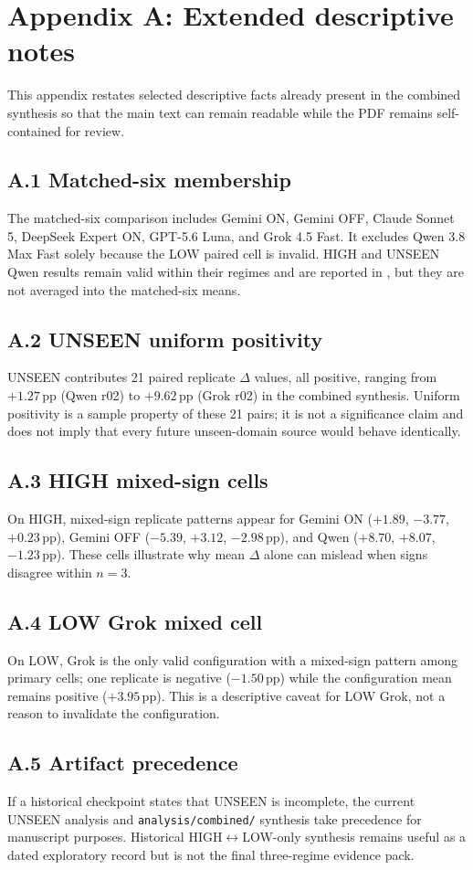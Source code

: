 \section*{Appendix A: Extended descriptive notes}
\label{sec:appendix}

This appendix restates selected descriptive facts already present in the combined synthesis so that the main text can remain readable while the PDF remains self-contained for review.

\subsection*{A.1 Matched-six membership}
The matched-six comparison includes Gemini ON, Gemini OFF, Claude Sonnet 5, DeepSeek Expert ON, GPT-5.6 Luna, and Grok 4.5 Fast.
It excludes Qwen 3.8 Max Fast solely because the LOW paired cell is invalid.
HIGH and UNSEEN Qwen results remain valid within their regimes and are reported in , but they are not averaged into the matched-six means.

\subsection*{A.2 UNSEEN uniform positivity}
UNSEEN contributes 21 paired replicate $\Delta$ values, all positive, ranging from $+1.27$\,pp (Qwen r02) to $+9.62$\,pp (Grok r02) in the combined synthesis.
Uniform positivity is a sample property of these 21 pairs; it is not a significance claim and does not imply that every future unseen-domain source would behave identically.

\subsection*{A.3 HIGH mixed-sign cells}
On HIGH, mixed-sign replicate patterns appear for Gemini ON ($+1.89$, $-3.77$, $+0.23$\,pp), Gemini OFF ($-5.39$, $+3.12$, $-2.98$\,pp), and Qwen ($+8.70$, $+8.07$, $-1.23$\,pp).
These cells illustrate why mean $\Delta$ alone can mislead when signs disagree within $n{=}3$.

\subsection*{A.4 LOW Grok mixed cell}
On LOW, Grok is the only valid configuration with a mixed-sign pattern among primary cells; one replicate is negative ($-1.50$\,pp) while the configuration mean remains positive ($+3.95$\,pp).
This is a descriptive caveat for LOW Grok, not a reason to invalidate the configuration.

\subsection*{A.5 Artifact precedence}
If a historical checkpoint states that UNSEEN is incomplete, the current UNSEEN analysis and \texttt{analysis/combined/} synthesis take precedence for manuscript purposes.
Historical HIGH$\leftrightarrow$LOW-only synthesis remains useful as a dated exploratory record but is not the final three-regime evidence pack.
